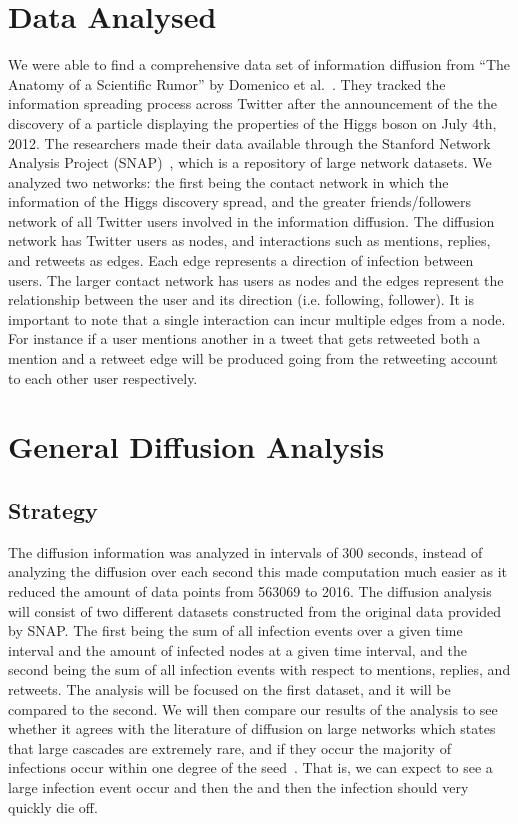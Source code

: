 \documentclass[12pt, oneside, openany]{article} %
\begin{document}
\section{Data Analysed}
We were able to find a comprehensive data set of information diffusion from ``The Anatomy of a Scientific Rumor'' by Domenico et al.~\cite{domenico}. They tracked the information spreading process across Twitter after the announcement of the the discovery of a particle displaying the properties of the Higgs boson on July 4th, 2012. The researchers made their data available through the Stanford Network Analysis Project (SNAP)~\cite{snap}, which is a repository of large network datasets. We analyzed two networks: the first being the contact network in which the information of the Higgs discovery spread, and the greater friends/followers network of all Twitter users involved in the information diffusion. The diffusion network has Twitter users as nodes, and interactions such as mentions, replies, and retweets as edges. Each edge represents a direction of infection between users. The larger contact network has users as nodes and the edges represent the relationship between the user and its direction (i.e. following, follower). It is important to note that a single interaction can incur multiple edges from a node. For instance if a user mentions another in a tweet that gets retweeted both a mention and a retweet edge will be produced going from the retweeting account to each other user respectively.

\section{General Diffusion Analysis}
\subsection{Strategy}
The diffusion information was analyzed in intervals of 300 seconds, instead of analyzing the diffusion over each second this made computation much easier as it reduced the amount of data points from 563069 to 2016. The diffusion analysis will consist of two different datasets constructed from the original data provided by SNAP. The first being the sum of all infection events over a given time interval and the amount of infected nodes at a given time interval, and the second being the sum of all infection events with respect to mentions, replies, and retweets. The analysis will be focused on the first dataset, and it will be compared to the second. We will then compare our results of the analysis to see whether it agrees with the literature of diffusion on large networks which states that large cascades are extremely rare, and if they occur the majority of infections occur within one degree of the seed~\cite{goel}. That is, we can expect to see a large infection event occur and then the and then the infection should very quickly die off.
\end{document}
